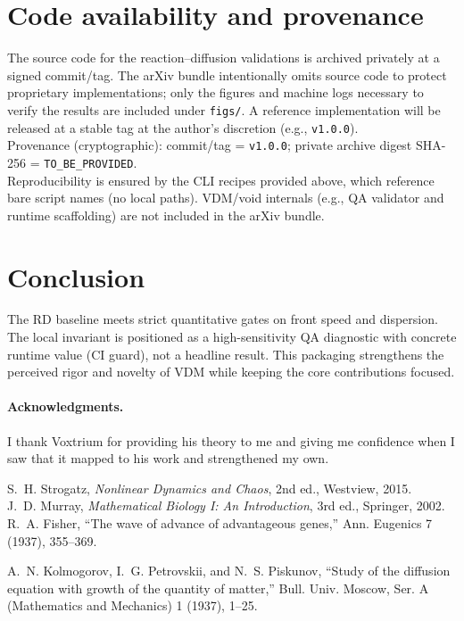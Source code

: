 \documentclass[11pt]{article}
\begin{document}
\section{Code availability and provenance}
The source code for the reaction--diffusion validations is archived privately at a signed commit/tag. The arXiv bundle intentionally omits source code to protect proprietary implementations; only the figures and machine logs necessary to verify the results are included under \texttt{figs/}. A reference implementation will be released at a stable tag at the author's discretion (e.g., \texttt{v1.0.0}).
\\
Provenance (cryptographic): commit/tag = \texttt{v1.0.0}; private archive digest SHA-256 = \texttt{TO\_BE\_PROVIDED}.
\\
Reproducibility is ensured by the CLI recipes provided above, which reference bare script names (no local paths). VDM/void internals (e.g., QA validator and runtime scaffolding) are not included in the arXiv bundle.

\section{Conclusion}
The RD baseline meets strict quantitative gates on front speed and dispersion. The local invariant is positioned as a high-sensitivity QA diagnostic with concrete runtime value (CI guard), not a headline result. This packaging strengthens the perceived rigor and novelty of VDM while keeping the core contributions focused.

\paragraph{Acknowledgments.}
I thank Voxtrium for providing his theory to me and giving me confidence when I saw that it mapped to his work and strengthened my own.

\begin{thebibliography}{9}
S.~H. Strogatz, \emph{Nonlinear Dynamics and Chaos}, 2nd ed., Westview, 2015.\\
J.~D. Murray, \emph{Mathematical Biology I: An Introduction}, 3rd ed., Springer, 2002.
R.~A. Fisher, ``The wave of advance of advantageous genes,'' Ann. Eugenics 7 (1937), 355--369.

A.~N. Kolmogorov, I.~G. Petrovskii, and N.~S. Piskunov, ``Study of the diffusion equation with growth of the quantity of matter,'' Bull. Univ. Moscow, Ser. A (Mathematics and Mechanics) 1 (1937), 1--25.

\end{thebibliography}
\end{document}
